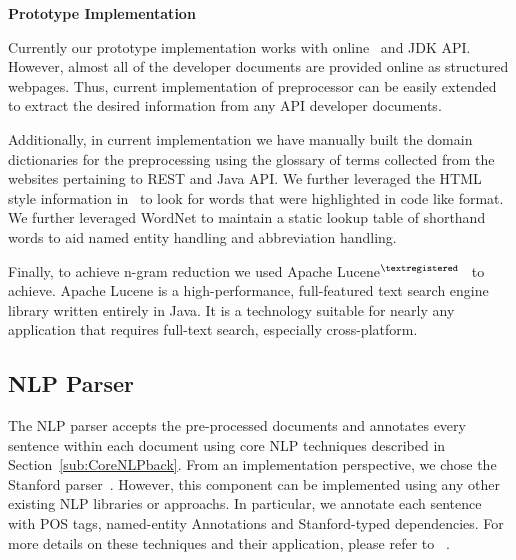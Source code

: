 
\textbf{Prototype Implementation}

Currently our prototype implementation works with online \amazon\ and JDK API. 
However, almost all of the developer documents are provided online as structured webpages.
Thus, current implementation of preprocessor can be easily extended to extract the desired information from any API developer documents.    

Additionally, in current implementation we have manually built the domain dictionaries for the preprocessing using the glossary of terms collected from the websites pertaining to REST and Java API.
We further leveraged the HTML style information in \amazon\ to look for words that were highlighted in code like format. We further leveraged WordNet to maintain a static lookup table of shorthand words to aid named entity handling and abbreviation handling. 

 
Finally, to achieve  n-gram reduction we used Apache Lucene$^{\textregistered}$~\cite{lucene} to achieve.
Apache Lucene is a high-performance, full-featured text search engine library written entirely in Java.
It is a technology suitable for nearly any application that requires full-text search, especially cross-platform.

	
\subsection{NLP Parser}


The NLP parser accepts the pre-processed documents and annotates every sentence within each document using core NLP techniques described in Section~\ref{sub:CoreNLPback}.
From an implementation perspective, we chose the Stanford parser~\cite{Manning:01}.
However, this component can be implemented using any other existing NLP libraries or approachs.
In particular, we annotate each sentence with POS tags, named-entity Annotations and Stanford-typed dependencies.
For more details on these techniques and their application, please refer to ~\cite{Marneffe06LREC, Marneffe08COLING, pandita12:inferring, pandita13:WHYPER, thummalapentaICSE12}.

